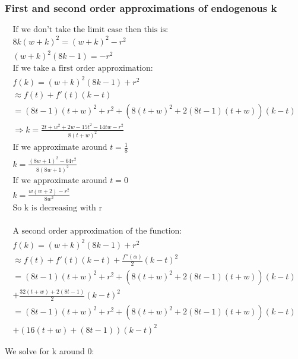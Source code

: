 \documentclass[12pt]{report}
\numberwithin{equation}{section}
\begin{document}
\subsubsection{First and second order approximations of endogenous k}

\begin{align*}
\text{If we don't take the limit case then this is:} \\
8k(w+k)^2= \left( w+k \right)^2 -r^2 \\
(w+k)^2(8k-1)=-r^2 \\
\text{If we take a first order approximation:} \\
f(k)= (w+k)^2(8k-1)+r^2 
\\
\approx f(t)+f'(t)(k-t) \\
=(8 t-1) (t+w)^2+r^2 
+(8 (t+w)^2+2 (8 t-1) (t+w))(k-t) \\
\Rightarrow k = \frac{2 t+w^2+2 w-15 t^2-14 t w-r^2}{8 (t+w)^2}
\\
\text{If we approximate around $t=\frac{1}{8}$} \\
k = \frac{(8 w+1)^2-64 r^2}{8 (8 w+1)^2} 
\\
\text{If we approximate around $t=0$} \\
k= \frac{w (w+2)-r^2}{8 w^2}
\\
\text{So k is decreasing with r} \\
\end{align*}

\begin{align*}
\text{A second order approximation of the function:} \\ 
f(k)= (w+k)^2(8k-1)+r^2 \\
\approx f(t)+f'(t)(k-t)+\frac{f''(\alpha)}{2}(k-t)^2 \\
= (8 t-1) (t+w)^2+r^2 
+(8 (t+w)^2+2 (8 t-1) (t+w))(k-t) \\
+\frac{32 (t+w)+2 (8 t-1)}{2}(k-t)^2 \\
= (8 t-1) (t+w)^2+r^2 
+(8 (t+w)^2+2 (8 t-1) (t+w))(k-t) \\
+(16 (t+w)+ (8 t-1))(k-t)^2 
\end{align*}



We solve for k around 0: 
\end{document}
